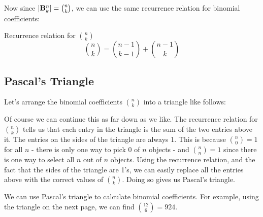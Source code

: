 \documentclass[12pt]{article}
\begin{document}
Now since $|\mathbf{B}^n_k| = {n \choose k}$, we can use the same recurrence relation for binomial coefficients:

\begin{defbox}{Recurrence relation for ${n \choose k}$}
  \[{n \choose k} = {n-1 \choose k-1} + {n-1 \choose k}\]
\end{defbox}

\subsection{Pascal's Triangle}

Let's arrange the binomial coefficients ${n \choose k}$ into a triangle like follows:

\begin{center}

\end{center}

Of course we can continue this as far down as we like.  The recurrence relation for ${n \choose k}$ tells us that each entry in the triangle is the sum of the two entries above it.  The entries on the sides of the triangle are always 1.  This is because ${n \choose 0} = 1$ for all $n$ - there is only one way to pick 0 of $n$ objects - and ${n \choose n} = 1$ since there is one way to select all $n$ out of $n$ objects.  Using the recurrence relation, and the fact that the sides of the triangle are 1's, we can easily replace all the entries above with the correct values of ${n \choose k}$.  Doing so gives us Pascal's triangle.

We can use Pascal's triangle to calculate binomial coefficients.  For example, using the triangle on the next page, we can find ${12 \choose 6} = 924$.
\end{document}
